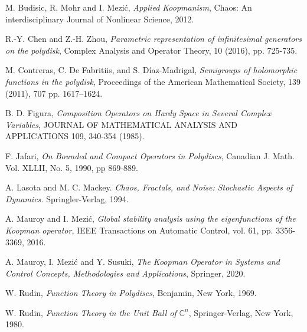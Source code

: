\documentclass{article}
\begin{document}
\begin{thebibliography}{99}

 M. Budisic, R. Mohr and I. Mezi\'c, \textit{Applied Koopmanism}, Chaos: An interdisciplinary Journal of Nonlinear Science, 2012.

 R.-Y. Chen and Z.-H. Zhou, \textit{Parametric representation of infinitesimal generators on the polydisk}, Complex Analysis and Operator Theory, 10 (2016), pp. 725-735.

M. Contreras, C. De Fabritiis, and S. Díaz-Madrigal, \textit{Semigroups of holomorphic functions in the polydisk}, Proceedings of the American Mathematical Society, 139 (2011), 707 pp. 1617–1624.

 B. D. Figura, \textit{Composition Operators on Hardy Space in Several Complex Variables}, JOURNAL OF MATHEMATICAL ANALYSIS AND APPLICATIONS 109, 340-354 (1985).

 F. Jafari, \textit{On Bounded and Compact Operators in Polydiscs}, Canadian J. Math. Vol. XLLII, No. 5, 1990, pp 869-889.

 A. Lasota and M. C. Mackey. \textit{ Chaos, Fractals, and Noise: Stochastic
Aspects of Dynamics.} Springler-Verlag, 1994.


A. Mauroy and I. Mezi\'c, \textit{Global stability analysis using the eigenfunctions of the Koopman operator}, IEEE Transactions on Automatic Control, vol. 61, pp. 3356-3369, 2016.


A. Mauroy, I. Mezi\'c and Y. Susuki, \textit{The Koopman Operator in Systems and Control Concepts, Methodologies and Applications}, Springer, 2020.


 W. Rudin, \textit{Function Theory in Polydiscs}, Benjamin, New York, 1969.

 W. Rudin, \textit{Function Theory in the Unit Ball of $\mathbb{C}^n$}, Springer-Verlag, New York, 1980.


\end{thebibliography}
\end{document}

